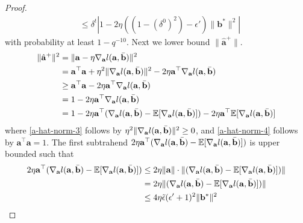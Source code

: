 \documentclass{article}
\theoremstyle{plain}
\theoremstyle{definition}
\theoremstyle{remark}
\begin{document}
\begin{proof}
\begin{align}
    & \leq \delta^t |1-2\eta ((1-(\delta^{0})^2) - \epsilon' )\lVert {\mathbf{b}^*}\rVert^2 | \label{E1}
\end{align}
with probability at least $1-q^{-10}$. Next we lower bound $\lVert \hat{\mathbf{a}}^{+} \rVert$.
\begin{align}
    \lVert \hat{\mathbf{a}}^{+} \rVert^2 & = \lVert \mathbf{a}-\eta \nabla_{\mathbf{a}}l(\mathbf{a},\Bar{\mathbf{b}})\rVert^2 \\
    & = \mathbf{a}^\top\mathbf{a}+\eta^2\lVert\nabla_{\mathbf{a}}l(\mathbf{a},\Bar{\mathbf{b}}) \rVert^2 - 2\eta\mathbf{a}^\top \nabla_{\mathbf{a}}l(\mathbf{a},\Bar{\mathbf{b}}) \label{a-hat-norm-2} \\
    & \geq \mathbf{a}^\top\mathbf{a} - 2\eta\mathbf{a}^\top \nabla_{\mathbf{a}}l(\mathbf{a},\Bar{\mathbf{b}}) \label{a-hat-norm-3} \\
    & = 1- 2\eta\mathbf{a}^\top \nabla_{\mathbf{a}}l(\mathbf{a},\Bar{\mathbf{b}})  \label{a-hat-norm-4}\\
    & = 1- 2\eta  \mathbf{a}^\top (\nabla_{\mathbf{a}}l(\mathbf{a},\Bar{\mathbf{b}}) -  \mathbb{E}[\nabla_{\mathbf{a}}l(\mathbf{a},\Bar{\mathbf{b}})])-2\eta  \mathbf{a}^\top  \mathbb{E}[\nabla_{\mathbf{a}}l(\mathbf{a},\Bar{\mathbf{b}})] 
\end{align}
where \eqref{a-hat-norm-3} follows by $\eta^2\lVert\nabla_{\mathbf{a}}l(\mathbf{a},\Bar{\mathbf{b}}) \rVert^2 \geq 0$, and \eqref{a-hat-norm-4} follows by $\mathbf{a}^\top\mathbf{a}=1$. The first subtrahend $2\eta  \mathbf{a}^\top (\nabla_{\mathbf{a}}l(\mathbf{a},\Bar{\mathbf{b}}) -  \mathbb{E}[\nabla_{\mathbf{a}}l(\mathbf{a},\Bar{\mathbf{b}})])$ is upper bounded such that
\begin{align}
    2\eta  \mathbf{a}^\top (\nabla_{\mathbf{a}}l(\mathbf{a},\Bar{\mathbf{b}}) -  \mathbb{E}[\nabla_{\mathbf{a}}l(\mathbf{a},\Bar{\mathbf{b}})]) & \leq  2\eta \| \mathbf{a} \|\cdot \| (\nabla_{\mathbf{a}}l(\mathbf{a},\Bar{\mathbf{b}}) -  \mathbb{E}[\nabla_{\mathbf{a}}l(\mathbf{a},\Bar{\mathbf{b}})])\|   \\
    & = 2\eta \| (\nabla_{\mathbf{a}}l(\mathbf{a},\Bar{\mathbf{b}}) -  \mathbb{E}[\nabla_{\mathbf{a}}l(\mathbf{a},\Bar{\mathbf{b}})])\| \\
    &\leq 4\eta \Tilde{\epsilon} (\epsilon'+1)^2\lVert \mathbf{b}^* \rVert^2 \label{denominator-a-grad-egrad}

\end{align}
\end{proof}
\end{document}
